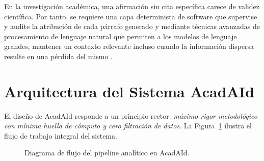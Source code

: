\documentclass[12pt,a4paper]{article}
\begin{document}
En la investigación académica, una afirmación sin cita específica carece de validez científica. Por tanto, se requiere una capa determinista de software que supervise y audite la atribución de cada párrafo generado y mediante técnicas avanzadas de procesamiento de lenguaje natural que permiten a los modelos de lenguaje grandes, mantener un contexto relevante incluso cuando la información dispersa resulte en una pérdida del mismo \cite{liu2024lost}.



\section{Arquitectura del Sistema AcadAId}
\label{sec:arquitectura}

El diseño de AcadAId responde a un principio rector: \textit{máximo rigor metodológico con mínima huella de cómputo y cero filtración de datos}. La Figura~\ref{fig:pipeline} ilustra el flujo de trabajo integral del sistema.

\begin{figure}[htbp]
\centering
{}
\caption{Diagrama de flujo del pipeline analítico en AcadAId.}
\label{fig:pipeline}
\end{figure}
\end{document}

